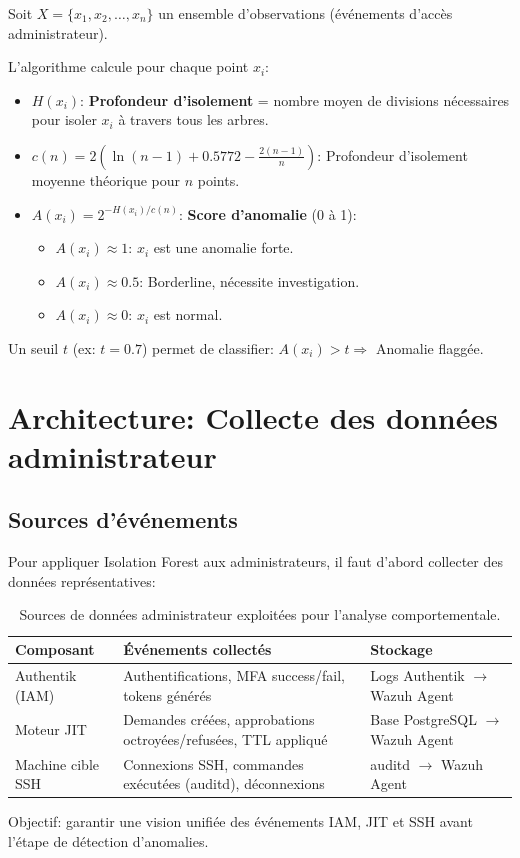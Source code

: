 Soit $X = \{x_1, x_2, \ldots, x_n\}$ un ensemble d'observations (événements d'accès administrateur).

L'algorithme calcule pour chaque point $x_i$:

\begin{itemize}
	\item $H(x_i)$: \textbf{Profondeur d'isolement} = nombre moyen de divisions nécessaires pour isoler $x_i$ à travers tous les arbres.
	
	\item $c(n) = 2 \left( \ln(n-1) + 0.5772 - \frac{2(n-1)}{n} \right)$: Profondeur d'isolement moyenne théorique pour $n$ points.
	
	\item $A(x_i) = 2^{-H(x_i)/c(n)}$: \textbf{Score d'anomalie} (0 à 1):
	\begin{itemize}
		\item $A(x_i) \approx 1$: $x_i$ est une anomalie forte.
		\item $A(x_i) \approx 0.5$: Borderline, nécessite investigation.
		\item $A(x_i) \approx 0$: $x_i$ est normal.
	\end{itemize}
\end{itemize}

Un seuil $t$ (ex: $t = 0.7$) permet de classifier: $A(x_i) > t \Rightarrow$ Anomalie flaggée.
\newpage
\section{Architecture: Collecte des données administrateur}

\subsection{Sources d'événements}

Pour appliquer Isolation Forest aux administrateurs, il faut d'abord collecter des données représentatives:

\begin{table}[h]
\centering
\begin{tabularx}{\textwidth}{|l|p{5cm}|p{6cm}|}
\hline
\textbf{Composant} & \textbf{Événements collectés} & \textbf{Stockage} \\
\hline
Authentik (IAM) & Authentifications, MFA success/fail, tokens générés & Logs Authentik $\rightarrow$ Wazuh Agent \\
\hline
Moteur JIT & Demandes créées, approbations octroyées/refusées, TTL appliqué & Base PostgreSQL $\rightarrow$ Wazuh Agent \\
\hline

Machine cible SSH & Connexions SSH, commandes exécutées (auditd), déconnexions & auditd $\rightarrow$ Wazuh Agent \\
\hline
\end{tabularx}
\caption{Sources de données administrateur exploitées pour l'analyse comportementale. }
\label{tab:sources_anomalies_admin}
\end{table}
Objectif: garantir une vision unifiée des événements IAM, JIT et SSH avant l'étape de détection d'anomalies.

